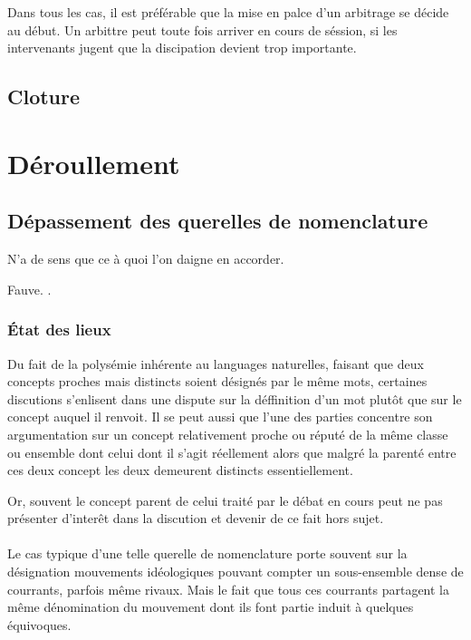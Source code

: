 Dans tous les cas, il est préférable que la mise en palce d’un arbitrage se décide au début. Un arbittre peut toute fois arriver en cours de séssion, si les intervenants jugent que la discipation devient trop importante.

\subsection{Cloture}
\section{Déroullement}
\subsection{Dépassement des querelles de nomenclature}
\epigraph{N’a de sens que ce à quoi l’on daigne en accorder.}{Fauve. .}
\subsubsection{État des lieux}
Du fait de la polysémie inhérente au languages naturelles, faisant que deux concepts proches mais distincts soient désignés par le même mots, certaines discutions s’enlisent dans une dispute sur la déffinition d’un mot plutôt que sur le concept auquel il renvoit. Il se peut aussi que l’une des parties concentre son argumentation sur un concept relativement proche ou réputé de la même classe ou ensemble dont celui dont il s’agit réellement alors que malgré la parenté entre ces deux concept les deux demeurent distincts essentiellement.

Or, souvent le concept parent de celui traité par le débat en cours peut ne pas présenter d’interêt dans la discution et devenir de ce fait hors sujet.

\paragraph{}
Le cas typique d’une telle querelle de nomenclature porte souvent sur la désignation mouvements idéologiques pouvant compter un sous-ensemble dense de courrants, parfois même rivaux. Mais le fait que tous ces courrants partagent la même dénomination du mouvement dont ils font partie induit à quelques équivoques.

